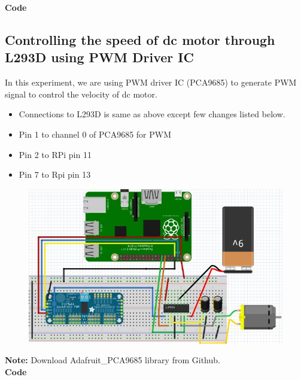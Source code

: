 \documentclass[11pt,a4paper]{article}
\begin{document}
	\newpage 
	\textbf{Code}
	\vspace{0.3cm}
	
	\subsection{Controlling the speed of dc motor through L293D using PWM Driver IC}
	In this experiment, we are using PWM driver IC (PCA9685) to generate PWM signal to control the velocity of dc motor.\\
	\begin{itemize}
		\item Connections to L293D is same as above except few changes listed below.
		\item Pin 1  to channel 0 of PCA9685 for PWM
		\item Pin 2 to RPi pin 11
		\item Pin 7 to Rpi pin 13 
	\end{itemize}
	\vspace{5mm}
	\begin{figure}[h!]
		\includegraphics[scale=0.6]{DC_motor_PCA9685.jpg}
		\centering
	\end{figure} \newpage
	\textbf{Note:} Download Adafruit\_PCA9685 library from Github.\\
	\textbf{Code}
	\vspace{0.3cm}
	
	\newpage
	
\end{document}
